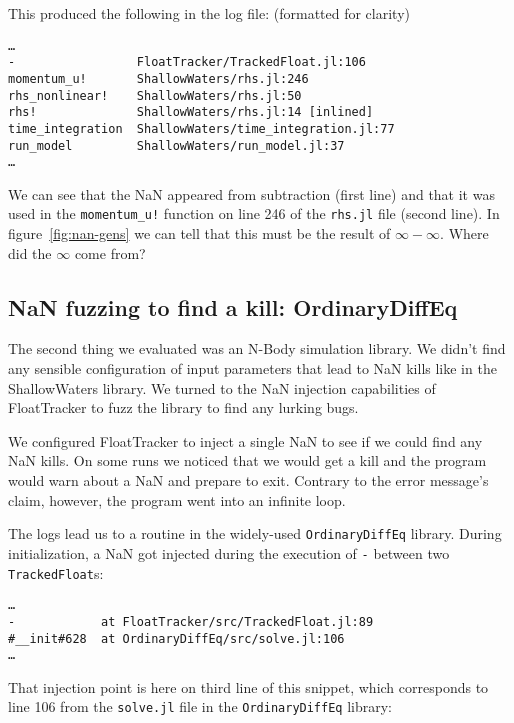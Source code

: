 \documentclass{juliacon}
\begin{document}
This produced the following in the log file: (formatted for clarity)

\begin{verbatim}
…
-                 FloatTracker/TrackedFloat.jl:106
momentum_u!       ShallowWaters/rhs.jl:246
rhs_nonlinear!    ShallowWaters/rhs.jl:50
rhs!              ShallowWaters/rhs.jl:14 [inlined]
time_integration  ShallowWaters/time_integration.jl:77
run_model         ShallowWaters/run_model.jl:37
…
\end{verbatim}

We can see that the NaN appeared from subtraction (first line) and that it was used in the \texttt{momentum\_u!} function on line 246 of the \texttt{rhs.jl} file (second line).
In figure~\ref{fig:nan-gens} we can tell that this must be the result of $\infty - \infty$.
Where did the $\infty$ come from?


\subsection{NaN fuzzing to find a kill: OrdinaryDiffEq}

The second thing we evaluated was an N-Body simulation library.
We didn't find any sensible configuration of input parameters that lead to NaN kills like in the ShallowWaters library.
We turned to the NaN injection capabilities of FloatTracker to fuzz the library to find any lurking bugs.

We configured FloatTracker to inject a single NaN to see if we could find any NaN kills.
On some runs we noticed that we would get a kill and the program would warn about a NaN and prepare to exit.
Contrary to the error message's claim, however, the program went into an infinite loop.

The logs lead us to a routine in the widely-used \texttt{OrdinaryDiffEq} library.
During initialization, a NaN got injected during the execution of \texttt{-} between two \texttt{TrackedFloat}s:

\begin{verbatim}
…
-            at FloatTracker/src/TrackedFloat.jl:89
#__init#628  at OrdinaryDiffEq/src/solve.jl:106
…
\end{verbatim}

That injection point is here on third line of this snippet, which corresponds to line 106 from the \texttt{solve.jl} file in the \texttt{OrdinaryDiffEq} library:
\end{document}
